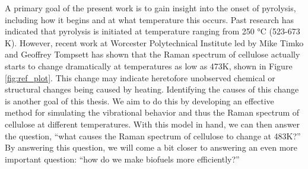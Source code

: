 A primary goal of the present work is to gain insight into the onset of pyrolysis, including how it begins and at what temperature this occurs. Past research has indicated that pyrolysis is initiated at temperature ranging from 250 \si{\celsius} (523-673 K)\cite{RefWorks:58}. However, recent work at Worcester Polytechnical Institute led by Mike Timko and Geoffrey Tompsett has shown that the Raman spectrum of cellulose actually starts to change dramatically at temperatures as low as 473K, shown in Figure \ref{fig:ref_plot}. This change may indicate heretofore unobserved chemical or structural changes being caused by heating. Identifying the causes of this change is another goal of this thesis. We aim to do this by developing an effective method for simulating the vibrational behavior and thus the Raman spectrum of cellulose at different temperatures. With this model in hand, we can then answer the question, ``what causes the Raman spectrum of cellulose to change at 483K?'' By answering this question, we will come  a bit closer to answering an even more important question: ``how do we make biofuels more efficiently?''
